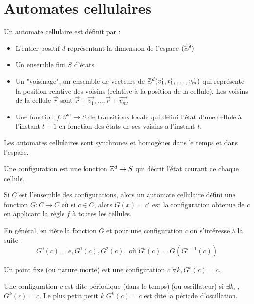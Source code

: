 \section{Automates cellulaires}

\begin{definition}
	Un automate cellulaire est définit par :
	\begin{itemize}
		\item L'entier positif $d$ représentant la dimension de l'espace $(\mathbb{Z}^d)$
		\item Un ensemble fini $S$ d'états
		\item Un "voisinage", \ie un ensemble de vecteurs de $\mathbb{Z}^d (\vec{v_1},  \vec{v_1}, \ldots ,\vec{v_m})$
		      qui représente la position relative des voisins (relative à la position de la cellule). Les voisins de la
		      cellule $\vec r$ sont $\vec r + \vec {v_1},  \ldots , \vec r + \vec {v_m}$.
		\item Une fonction $f : S ^ m \to S$ de transitions locale qui défini l'état d'une cellule à l'instant $t + 1$
		      en fonction des états de ses voisins a l'instant $t$.
	\end{itemize}
\end{definition}

Les automates cellulaires sont synchrones et homogènes dans le temps et dans l'espace.

\begin{definition}
	Une configuration est une fonction $\mathbb{Z} ^ d \to S$ qui décrit l'état courant de chaque cellule.

	Si $C$ est l'ensemble des configurations, alors un automate cellulaire défini une fonction $G: C \to C$ où si $c \in C$, alors
	$G(x) = c'$ est la configuration obtenue de $c$ en applicant la règle $f$ à toutes les cellules.

	En général, en itère la fonction $G$ et pour une configuration $c$ on s'intéresse à la suite :
	$$ G^0 (c) = e, G^1 (c), G^2 (c), \text{ où } G^i (c) = G ( G^{i - 1 }(c))$$
\end{definition}

\begin{definition}
	Un point fixe (ou nature morte) est une configuration $c$ \tlq $\forall k, G^k(c) = c$.
\end{definition}


\begin{definition}
	Une configuration $c$ est dite périodique (dans le temps) (ou oscillateur) si $\exists k$, \tq , $G^k(c) = c$. Le plus petit
	petit $k$ \tq $G^k(c) = c$ est dite la période d'oscillation.
\end{definition}

